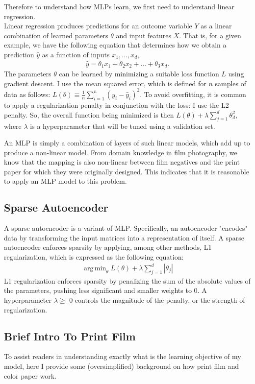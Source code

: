 \documentclass[twoside,11pt]{article}
\DeclareMathOperator*{\argmin}{arg\,min}
\begin{document}
Therefore to understand how MLPs learn, we first need to understand linear regression.\\
Linear regression produces predictions for an outcome variable $Y$ as a linear combination of learned parameters $\theta$ and input features $X$. That is, for a given example, we have the following equation that determines how we obtain a prediction $\widehat{y}$ as a function of inputs $x_1, \dots, x_d$,
	\begin{align*}
		\widehat{y} = \theta_1 x_1 + \theta_2 x_2 + \dots + \theta_3 x_d.
	\end{align*}	
	The parameters $\theta$ can be learned by minimizing a suitable loss function $L$ using gradient descent. I  use the mean squared error, which is defined for $n$ samples of data as follows: $L(\theta) \equiv \frac{1}{n} \sum_{i=1}^{n}(y_i - \widehat{y}_i)^2$. To avoid overfitting, it is common to apply a regularization penalty in conjunction with the loss: I use the L2 penalty. So, the overall function being minimized is then $L(\theta) + \lambda \sum_{j=1}^d \theta_d^2$, where $\lambda$ is a hyperparameter that will be tuned using a validation set.

An MLP is simply a combination of layers of such linear models, which add up to produce a non-linear model. 
From domain knowledge in film photography, we know that the mapping is also non-linear between film negatives and the print paper for which they were originally designed.
This indicates that it is reasonable to apply an MLP model to this problem.

\subsection{Sparse Autoencoder}
A sparse autoencoder is a variant of MLP. Specifically, an autoencoder "encodes" data by transforming the input matrices into a representation of itself. 
A sparse autoencoder enforces sparsity by applying, among other methods, L1 regularization, which is expressed as the following equation:
\begin{align*}
	\argmin_{\theta} L(\theta)+\lambda \sum_{j=1}^{d} |\theta_j|
\end{align*}
L1 regularization enforces sparsity by penalizing the sum of the absolute values of the parameters, pushing less significant and smaller weights to 0.
A hyperparameter $\lambda \geq$ 0 controls the magnitude of the penalty, or the strength of regularization.

\subsection{Brief Intro To Print Film}
	To assist readers in understanding exactly what is the learning objective of my model, here I provide some (oversimplified) background on how print film and color paper work.
\end{document}
